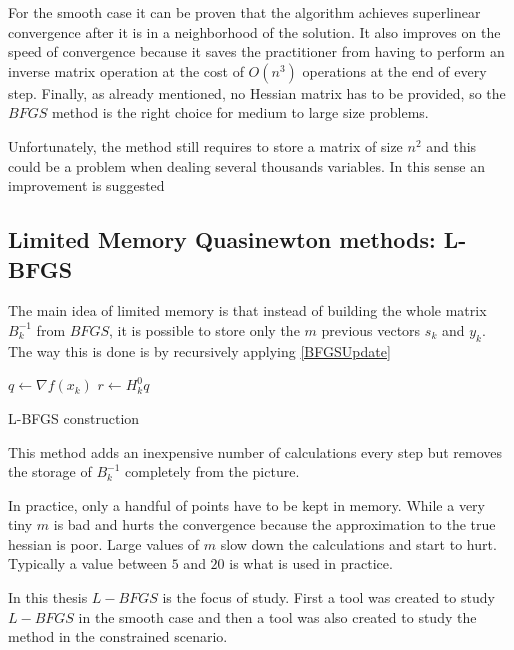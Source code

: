 For the smooth case it can be proven that the algorithm achieves superlinear convergence after it is in a neighborhood of the solution.  It also improves on the speed of convergence because it saves the practitioner from having to perform an inverse matrix operation at the cost of $O(n^3)$ operations at the end of every step.  Finally, as already mentioned, no Hessian matrix has to be provided, so the $BFGS$ method is the right choice for medium to large size problems.

Unfortunately, the method still requires to store a matrix of size $n^2$ and this could be a problem when dealing several thousands variables.  In this sense an improvement is suggested

\subsection{Limited Memory Quasinewton methods: L-BFGS }

The main idea of limited memory is that instead of building the whole matrix $B_k^{-1}$ from $BFGS$, it is possible to store only the $m$ previous vectors $s_k$ and $y_k$.  The way this is done is by recursively applying \ref{BFGSUpdate} \citep{nocedal}


\linesnumbered
\begin{algorithm}[H]
 \SetAlgoLined %
 
 $q \leftarrow \nabla f(x_k)$\;
 $r \leftarrow H_k^0q$\;
 \caption{L-BFGS construction\label{LBFGSalgo}}
\end{algorithm}

This method adds an inexpensive number of calculations every step but removes the storage of $B_k^{-1}$ completely from the picture.

In practice, only a handful of points have to be kept in memory.  While a very tiny $m$ is bad and hurts the convergence because the approximation to the true hessian is poor.  Large values of $m$ slow down the calculations and start to hurt.  Typically a value between $5$ and $20$ is what is used in practice.

In this thesis $L-BFGS$ is the focus of study.  First a tool was created to study $L-BFGS$ in the smooth case and then a tool was also created to study the method in the constrained scenario.


